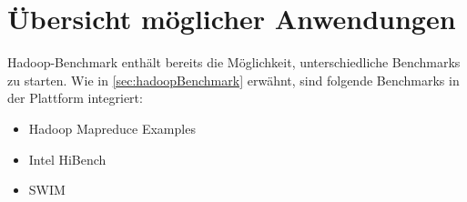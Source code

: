 \section{Übersicht möglicher Anwendungen}\label{sec:appOverview}


Hadoop-Benchmark enthält bereits die Möglichkeit, unterschiedliche Benchmarks zu starten. Wie in \autoref{sec:hadoopBenchmark} erwähnt, sind folgende Benchmarks in der Plattform integriert:

\begin{itemize}
    \item Hadoop Mapreduce Examples
    \item Intel HiBench
    \item \ac{SWIM}
\end{itemize}




